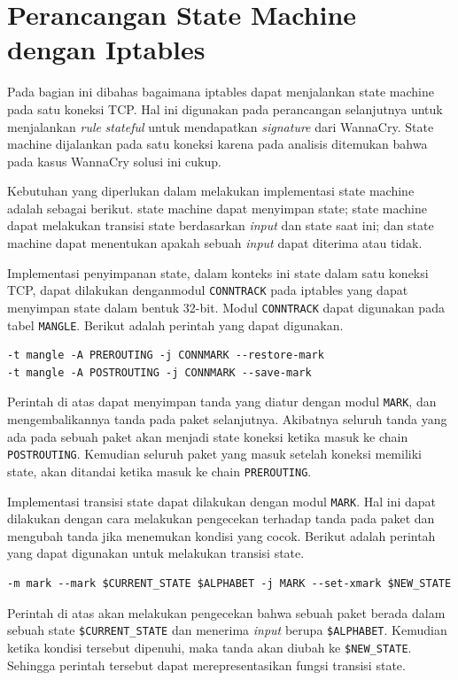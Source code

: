 \section{Perancangan State Machine dengan Iptables}

Pada bagian ini dibahas bagaimana iptables dapat menjalankan state machine pada satu koneksi TCP. Hal ini digunakan pada perancangan selanjutnya untuk menjalankan \textit{rule} \textit{stateful} untuk mendapatkan \textit{signature} dari WannaCry. State machine dijalankan pada satu koneksi karena pada analisis ditemukan bahwa pada kasus WannaCry solusi ini cukup.

Kebutuhan yang diperlukan dalam melakukan implementasi state machine adalah sebagai berikut. state machine dapat menyimpan state; state machine dapat melakukan transisi state berdasarkan \textit{input} dan state saat ini; dan state machine dapat menentukan apakah sebuah \textit{input} dapat diterima atau tidak.

Implementasi penyimpanan state, dalam konteks ini state dalam satu koneksi TCP, dapat dilakukan denganmodul \verb|CONNTRACK| pada iptables yang dapat menyimpan state dalam bentuk 32-bit. Modul \verb|CONNTRACK| dapat digunakan pada tabel \verb|MANGLE|. Berikut adalah perintah yang dapat digunakan.

\begin{lstlisting}
-t mangle -A PREROUTING -j CONNMARK --restore-mark
-t mangle -A POSTROUTING -j CONNMARK --save-mark
\end{lstlisting} 

Perintah di atas dapat menyimpan tanda yang diatur dengan modul \verb|MARK|, dan mengembalikannya tanda pada paket selanjutnya. Akibatnya seluruh tanda yang ada pada sebuah paket akan menjadi state koneksi ketika masuk ke chain \verb|POSTROUTING|. Kemudian seluruh paket yang masuk setelah koneksi memiliki state, akan ditandai ketika masuk ke chain \verb|PREROUTING|.

Implementasi transisi state dapat dilakukan dengan modul \verb|MARK|. Hal ini dapat dilakukan dengan cara melakukan pengecekan terhadap tanda pada paket dan mengubah tanda jika menemukan kondisi yang cocok. Berikut adalah perintah yang dapat digunakan untuk melakukan transisi state.

\begin{lstlisting}
-m mark --mark $CURRENT_STATE $ALPHABET -j MARK --set-xmark $NEW_STATE
\end{lstlisting}

Perintah di atas akan melakukan pengecekan bahwa sebuah paket berada dalam sebuah state \verb|$CURRENT_STATE| dan menerima \textit{input} berupa \verb|$ALPHABET|. Kemudian ketika kondisi tersebut dipenuhi, maka tanda akan diubah ke \verb|$NEW_STATE|. Sehingga perintah tersebut dapat merepresentasikan fungsi transisi state.

